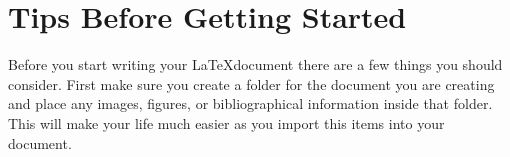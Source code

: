 \section{Tips Before Getting Started}
	Before you start writing your \LaTeX document there are a few things you should consider.  First make sure you create a folder for the document you are creating and place any images, figures, or bibliographical information inside that folder.  This will make your life much easier as you import this items into your document.